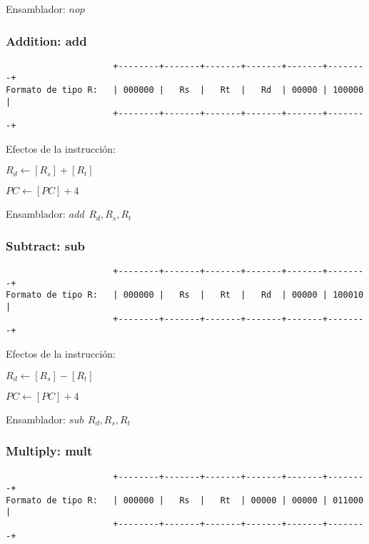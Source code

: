 \documentclass[letterpaper,11pt]{scrartcl}
\begin{document}
Ensamblador: $nop$


\subsubsection*{Addition: \textbf{add}}

\begin{verbatim}
                     +--------+-------+-------+-------+-------+--------+ 
Formato de tipo R:   | 000000 |   Rs  |   Rt  |   Rd  | 00000 | 100000 | 
                     +--------+-------+-------+-------+-------+--------+ 
\end{verbatim}

Efectos de la instrucción: 

$R_{d} \leftarrow [R_{s}] + [R_{t}]$

$PC \leftarrow [PC] + 4$

Ensamblador: $add\hspace{5pt}R_{d}, R_{s}, R_{t}$


\subsubsection*{Subtract: \textbf{sub}}

\begin{verbatim}
                     +--------+-------+-------+-------+-------+--------+ 
Formato de tipo R:   | 000000 |   Rs  |   Rt  |   Rd  | 00000 | 100010 | 
                     +--------+-------+-------+-------+-------+--------+ 
\end{verbatim}

Efectos de la instrucción: 

$R_{d} \leftarrow [R_{s}] - [R_{t}]$

$PC \leftarrow [PC] + 4$

Ensamblador: $sub\hspace{5pt}R_{d}, R_{s}, R_{t}$


\subsubsection*{Multiply: \textbf{mult}}

\begin{verbatim}
                     +--------+-------+-------+-------+-------+--------+ 
Formato de tipo R:   | 000000 |   Rs  |   Rt  | 00000 | 00000 | 011000 | 
                     +--------+-------+-------+-------+-------+--------+ 
\end{verbatim}
\end{document}
